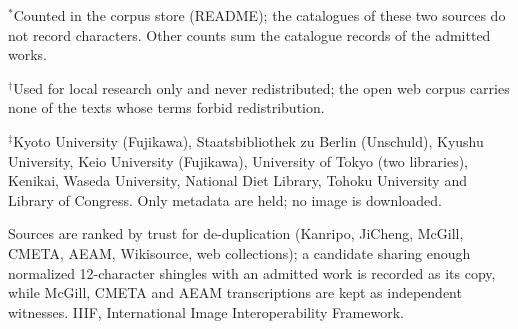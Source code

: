 \begin{table}[t]
\begin{tabular}{lllll}
\bottomrule
\end{tabular}
\par\footnotesize
$^{*}$Counted in the corpus store (README); the catalogues of these two sources do not record characters. Other counts sum the catalogue records of the admitted works.\par
$^{\dagger}$Used for local research only and never redistributed; the open web corpus carries none of the texts whose terms forbid redistribution.\par
$^{\ddagger}$Kyoto University (Fujikawa), Staatsbibliothek zu Berlin (Unschuld), Kyushu University, Keio University (Fujikawa), University of Tokyo (two libraries), Kenikai, Waseda University, National Diet Library, Tohoku University and Library of Congress. Only metadata are held; no image is downloaded.\par
Sources are ranked by trust for de-duplication (Kanripo, JiCheng, McGill, CMETA, AEAM, Wikisource, web collections); a candidate sharing enough normalized 12-character shingles with an admitted work is recorded as its copy, while McGill, CMETA and AEAM transcriptions are kept as independent witnesses. IIIF, International Image Interoperability Framework.\par
\end{table}
